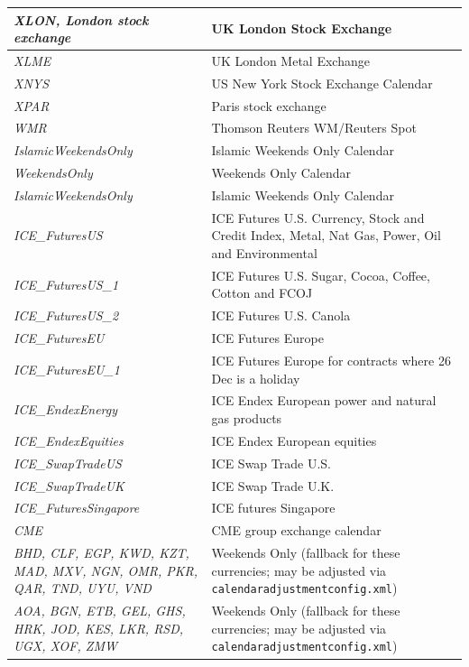 \begin{longtable}{| p{} | p{} |}
    \emph{XLON, London stock exchange} & UK London Stock Exchange \\ \hline
    \emph{XLME} & UK London Metal Exchange \\ \hline
    \emph{XNYS} & US New York Stock Exchange Calendar \\ \hline
    \emph{XPAR} & Paris stock exchange \\ \hline
    \emph{WMR} & Thomson Reuters WM/Reuters Spot \\ \hline
    \emph{IslamicWeekendsOnly} & Islamic Weekends Only Calendar \\ \hline
    \emph{WeekendsOnly} & Weekends Only Calendar \\ \hline
    \emph{IslamicWeekendsOnly} & Islamic Weekends Only Calendar \\ \hline
    \emph{ICE\_FuturesUS} & ICE Futures U.S. Currency, Stock and Credit Index, Metal, Nat Gas, Power, Oil and Environmental \\ \hline
    \emph{ICE\_FuturesUS\_1} & ICE Futures U.S. Sugar, Cocoa, Coffee, Cotton and FCOJ \\ \hline
    \emph{ICE\_FuturesUS\_2} & ICE Futures U.S. Canola \\ \hline
    \emph{ICE\_FuturesEU} & ICE Futures Europe \\ \hline
    \emph{ICE\_FuturesEU\_1} & ICE Futures Europe for contracts where 26 Dec is a holiday \\ \hline
    \emph{ICE\_EndexEnergy} & ICE Endex European power and natural gas products \\ \hline
    \emph{ICE\_EndexEquities} & ICE Endex European equities \\ \hline
    \emph{ICE\_SwapTradeUS} & ICE Swap Trade U.S. \\ \hline
    \emph{ICE\_SwapTradeUK} & ICE Swap Trade U.K. \\ \hline
    \emph{ICE\_FuturesSingapore} & ICE futures Singapore \\ \hline
    \emph{CME} & CME group exchange calendar \\ \hline
    \emph{BHD, CLF, EGP, KWD, KZT, MAD, MXV, NGN, OMR, PKR, QAR, TND, UYU, VND} & Weekends Only (fallback for these currencies; may be adjusted via {\tt calendaradjustmentconfig.xml}) \\ \hline
    \emph{AOA, BGN, ETB, GEL, GHS, HRK, JOD, KES, LKR, RSD, UGX, XOF, ZMW} & Weekends Only (fallback for these currencies; may be adjusted via {\tt calendaradjustmentconfig.xml}) \\ \hline

\end{longtable}
